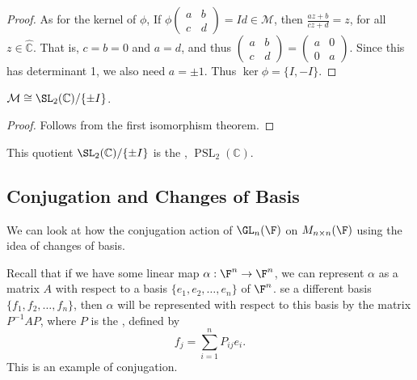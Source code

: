 \documentclass[a4paper]{scrartcl}
\begin{document}
\begin{proof}
	As for the kernel of $\phi$, If $\phi\begin{pmatrix}
		a & b \\ c & d
	\end{pmatrix} = Id \in \mathcal{M}$, then $\frac{az + b}{cz + d} = z$, for all $z \in \hat{\mathbb{C}}$. That is, $c = b = 0$ and $a = d$, and thus $\begin{pmatrix}
		a & b \\ c & d
	\end{pmatrix} = \begin{pmatrix}
		a & 0 \\ 0 & a
	\end{pmatrix}$. Since this has determinant 1, we also need $a = \pm  1$. Thus $\ker \phi = \{I, -I\}$.
\end{proof}

\begin{corollary}
	$\mathcal{M} \cong \SL_2(\mathbb{C}) / \{\pm I\}$.
\end{corollary}
\begin{proof}
	Follows from the first isomorphism theorem.
\end{proof}

This quotient $\SL_2(\mathbb{C}) / \{\pm I\}$ is the , $\operatorname{PSL}_2(\mathbb{C})$.


\subsection{Conjugation and Changes of Basis}

We can look at how the conjugation action of $\GL_{n} (\F)$ on $M_{n \times n}(\F)$ using the idea of changes of basis.

Recall that if we have some linear map $\alpha : \F^n \rightarrow \F^n$, we can represent $\alpha$ as a matrix $A$ with respect to a basis $\{e_1, e_2, \dots, e_n\}$ of $\F^n$.
se a different basis $\{f_1, f_2, \dots, f_n\}$, then $\alpha$ will be represented with respect to this basis by the matrix $P^{-1} A P$, where $P$ is the , defined by
$$
	f_j = \sum_{i = 1}^n P_{ij} e_i.
$$
This is an example of conjugation.
\end{document}
